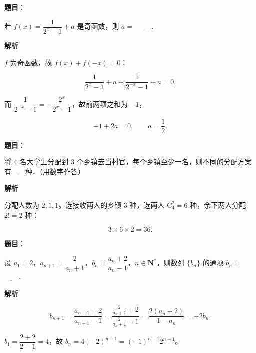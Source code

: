 \begin{answer}

\textbf{题目}：

若 $f(x)=\dfrac1{2^x-1}+a$ 是奇函数，则 $a=$ $\underline{\qquad}$．

\textbf{解析}

$f$ 为奇函数，故 $f(x)+f(-x)=0$：

\nopagebreak[4]
\[\frac1{2^x-1}+a+\frac1{2^{-x}-1}+a=0.\]

而 $\dfrac1{2^{-x}-1}=-\dfrac{2^x}{2^x-1}$，故前两项之和为 $-1$，

\nopagebreak[4]
\[-1+2a=0,\qquad a=\frac12.\]


\end{answer}
\begin{answer}

\textbf{题目}：

将 $4$ 名大学生分配到 $3$ 个乡镇去当村官，每个乡镇至少一名，则不同的分配方案有$\underline{\qquad}$种．（用数字作答）

\textbf{解析}

分配人数为 $2,1,1$。选接收两人的乡镇 $3$ 种，选两人 $\mathrm C_4^2=6$ 种，余下两人分配 $2!=2$ 种：

\nopagebreak[4]
\[3\times6\times2=36.\]


\end{answer}
\begin{answer}

\textbf{题目}：

设 $a_1=2$，$a_{n+1}=\dfrac2{a_n+1}$，$b_n=\dfrac{a_n+2}{a_n-1}$，$n\in\mathbf N^*$，则数列 $\{b_n\}$ 的通项 $b_n=$ $\underline{\qquad}$．

\textbf{解析}

\nopagebreak[4]
\[b_{n+1}=\frac{a_{n+1}+2}{a_{n+1}-1}
=\frac{\frac2{a_n+1}+2}{\frac2{a_n+1}-1}
=\frac{2(a_n+2)}{1-a_n}=-2b_n.\]

$b_1=\dfrac{2+2}{2-1}=4$，故 $b_n=4(-2)^{n-1}=(-1)^{n-1}2^{n+1}$。


\end{answer}
